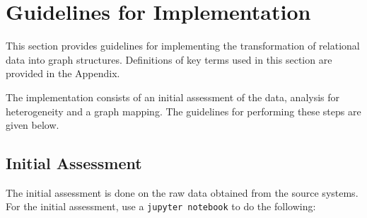 \documentclass{article}
\begin{document}
\section{Guidelines for Implementation}\label{sec:implementation_guidelines}
This section provides guidelines for implementing the transformation of relational data into graph structures. Definitions of key terms used in this section are provided in the Appendix.

The implementation consists of an initial assessment of the data, analysis for heterogeneity and a graph mapping. The guidelines for performing these steps are given below. 

\subsection{Initial Assessment} \label{sec:initial_assessment}
The initial assessment is done on the raw data obtained from the source systems. For the initial assessment, use a \texttt{jupyter notebook} to do the following:
\end{document}
